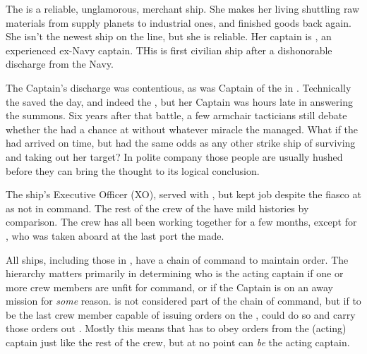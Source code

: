 \documentclass[blue]{TMFHope}
\begin{document}
\name{\bHope{}}

The \pNew{} is a reliable, unglamorous, merchant ship. She makes her living shuttling raw materials from supply planets to industrial ones, and finished goods back again. She isn't the newest ship on the line, but she is reliable. Her captain is \cCap{\full}, an experienced ex-Navy captain. THis is \cCap{\their} first civilian ship after a dishonorable discharge from the Navy.  

The Captain's discharge was contentious, as \cCap{} was Captain of the \pOld{} in \pBattle{}. Technically the \pOld{} saved the day, and indeed the \pPlan{}, but her Captain was hours late in answering the summons. Six years after that battle, a few armchair tacticians still debate whether the \pPlan{} had a chance at \pHome{} without whatever miracle the \pOld{} managed. What if the \pOld{} had arrived on time, but had the same odds as any other strike ship of surviving and taking out her target? In polite company those people are usually hushed before they can bring the thought to its logical conclusion.

The ship's Executive Officer (XO), \cXO{} served with \cCap{}, but kept \cXO{\their} job despite the fiasco at \pBattle{} as \cXO{\they} \cXO{\were} not in command. The rest of the crew of the \pNew{} have mild histories by comparison. The crew has all been working together for a few months, except for \cBoy{}, who was taken aboard at the last port the \pNew{} made. 

All ships, including those in \pTMF{}, have a chain of command to maintain order. The hierarchy matters primarily in determining who is the acting captain if one or more crew members are unfit for command, or if the Captain is on an away mission for \emph{some} reason. \cBoy{} is not considered part of the chain of command, but if \cBoy{\they} \cBoy{\were} to be the last crew member capable of issuing orders on the \pNew{}, \cBoy{\they} could do so and carry those orders out \cBoy{\themself}. Mostly this means that \cBoy{} has to obey orders from the (acting) captain just like the rest of the crew, but at no point can \cBoy{} \emph{be} the acting captain.
\end{document}
